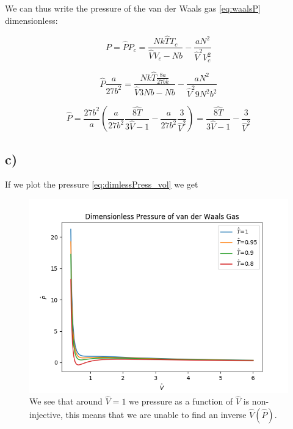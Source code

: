 \documentclass[a4paper,norsk, 10pt]{article}
\begin{document}
We can thus write the pressure of the van der Waals gas \eqref{eq:waalsP} dimensionless:

\begin{equation*}
P = \hat{P}P_c =  \frac{Nk\hat{T}T_c}{\hat{V}V_c-Nb} - \frac{aN^2}{\hat{V}^2 V_c^2}
\label{eq:scaling}
\end{equation*}

\begin{equation*}
\hat{P}\frac{a}{27b^2} = \frac{Nk\hat{T}\frac{8a}{27bk}}{\hat{V}3Nb-Nb} - \frac{aN^2}{\hat{V}^2 9N^2b^2}
\end{equation*}

\begin{equation}
\hat{P} = \frac{27b^2}{a}\left(\frac{a}{27b^2}\frac{\hat{8T}}{3\hat{V} - 1} - \frac{a}{27b^2}\frac{3}{\hat{V}^2}\right) = \frac{\hat{8T}}{3\hat{V} - 1} - \frac{3}{\hat{V}^2}
\label{eq:dimlessPress_vol}
\end{equation}

\subsection{c)}

If we plot the pressure \eqref{eq:dimlessPress_vol} we get

\begin{figure}[H]
\centering
\includegraphics[scale=0.5]{p3c.png}
\caption{We see that around $\hat{V} = 1$ we pressure as a function of $\hat{V}$ is non-injective, this means that we are unable to find an inverse $\hat{V}(\hat{P})$.}
\end{figure}
\end{document}
